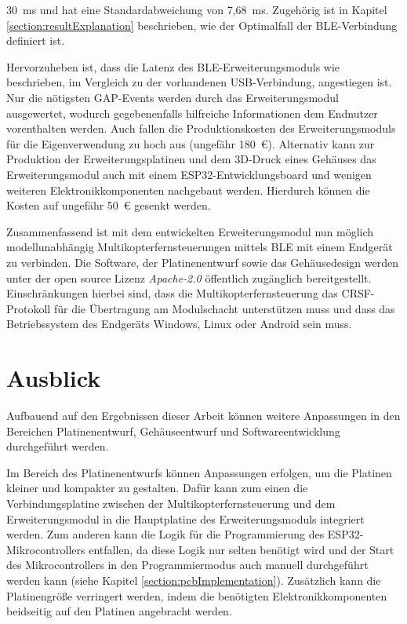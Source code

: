 30~ms und hat eine Standardabweichung von 7,68~ms. Zugehörig ist in Kapitel \ref{section:resultExplanation} beschrieben, wie der Optimalfall der \ac{BLE}-Verbindung definiert ist.

Hervorzuheben ist, dass die Latenz des \ac{BLE}-Erweiterungsmoduls wie beschrieben, im Vergleich zu der vorhandenen USB-Verbindung, angestiegen ist. Nur die nötigsten \ac{GAP}-Events werden durch das Erweiterungsmodul ausgewertet, wodurch gegebenenfalls hilfreiche Informationen dem Endnutzer vorenthalten werden. Auch fallen die Produktionskosten des Erweiterungsmoduls für die Eigenverwendung zu hoch aus (ungefähr 180~€). Alternativ kann zur Produktion der Erweiterungsplatinen und dem 3D-Druck eines Gehäuses das Erweiterungsmodul auch mit einem ESP32-Entwicklungsboard und wenigen weiteren Elektronikkomponenten nachgebaut werden. Hierdurch können die Kosten auf ungefähr 50~€ gesenkt werden. 

Zusammenfassend ist mit dem entwickelten Erweiterungsmodul nun möglich modellunabhängig Multikopterfernsteuerungen mittels \ac{BLE} mit einem Endgerät zu verbinden. Die Software, der Platinenentwurf sowie das Gehäusedesign werden unter der open source Lizenz \textit{Apache-2.0} öffentlich zugänglich bereitgestellt. Einschränkungen hierbei sind, dass die Multikopterfernsteuerung das CRSF-Protokoll für die Übertragung am Modulschacht unterstützen muss und dass das Betriebssystem des Endgeräts Windows, Linux oder Android sein muss.

\section{Ausblick}
Aufbauend auf den Ergebnissen dieser Arbeit können weitere Anpassungen in den Bereichen Platinenentwurf, Gehäuseentwurf und Softwareentwicklung durchgeführt werden.

Im Bereich des Platinenentwurfs können Anpassungen erfolgen, um die Platinen kleiner und kompakter zu gestalten. Dafür kann zum einen die Verbindungsplatine zwischen der Multikopterfernsteuerung und dem Erweiterungsmodul in die Hauptplatine des Erweiterungsmoduls integriert werden. Zum anderen kann die Logik für die Programmierung des ESP32-Mikrocontrollers entfallen, da diese Logik nur selten benötigt wird und der Start des Mikrocontrollers in den Programmiermodus auch manuell durchgeführt werden kann (siehe Kapitel \ref{section:pcbImplementation}). Zusätzlich kann die Platinengröße verringert werden, indem die benötigten Elektronikkomponenten beidseitig auf den Platinen angebracht werden.

